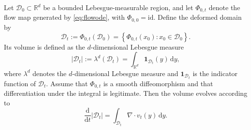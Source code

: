 \documentclass[12pt,a4paper,oneside]{book}
\begin{document}
\begin{corollary}
\label{cor:volume}
\label{src:p9q5}
Let $\mathcal D_0\subset\mathbb R^d$ be a bounded Lebesgue-measurable
region, and let $\Phi_{0,t}$ denote the flow map generated by
\eqref{eq:flowode}, with $\Phi_{0,0}=\mathrm{id}$. Define the
deformed domain by
\begin{equation*}
    \mathcal D_t:=\Phi_{0,t}(\mathcal D_0)
    =\left\{\Phi_{0,t}(x_0):x_0\in\mathcal D_0\right\}.
\end{equation*}
Its volume is defined as the $d$-dimensional Lebesgue measure
\begin{equation*}
    |\mathcal D_t| := \lambda^d(\mathcal D_t) = \int_{\mathbb R^d}
    \mathbf 1_{\mathcal D_t}(y)\,\mathrm dy,
\end{equation*}
where $\lambda^d$ denotes the $d$-dimensional Lebesgue measure and $\mathbf 1_{\mathcal D_t}$ is the indicator function
of $\mathcal D_t$. Assume that $\Phi_{0,t}$ is a smooth diffeomorphism and that differentiation under the integral is
legitimate. Then the volume evolves according to
\begin{equation}
    \frac{\mathrm d}{\mathrm dt}|\mathcal D_t| = \int_{\mathcal D_t}\nabla\cdot v_t(y)\,\mathrm dy.
    \label{eq:volume-transport}
\end{equation}
\end{corollary}
\end{document}
